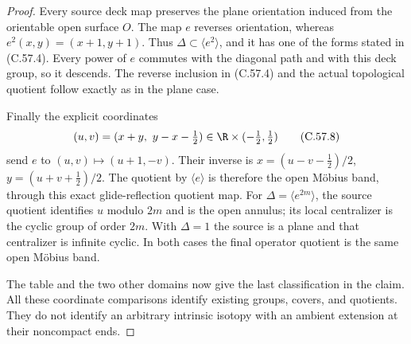\begin{proof}
Every source deck map preserves
the plane orientation induced
from the orientable open surface
$O$. The map $e$ reverses orientation,
whereas $e^2(x,y)=(x+1,y+1)$.
Thus $\Delta\subset\langle e^2\rangle$,
and it has one of the forms stated
in (C.57.4).
Every power of $e$ commutes with
the diagonal path and with this
deck group, so it descends.
The reverse inclusion in (C.57.4)
and the actual topological quotient
follow exactly as in the plane case.

Finally the explicit coordinates
\[
          (u,v)=(x+y,\ y-x-\tfrac12)
        \in\R\times(-\tfrac12,\tfrac12)                 \tag{C.57.8}
\]
send $e$ to $(u,v)\mapsto(u+1,-v)$.
Their inverse is
$x=(u-v-\tfrac12)/2$,
$y=(u+v+\tfrac12)/2$.
The quotient by $\langle e\rangle$
is therefore the open M\"obius
band, through this exact
glide-reflection quotient map.
For $\Delta=\langle e^{2m}\rangle$,
the source quotient identifies
$u$ modulo $2m$ and is the open
annulus; its local centralizer
is the cyclic group of order
$2m$. With $\Delta=1$ the source
is a plane and that centralizer
is infinite cyclic.
In both cases the final operator
quotient is the same open
M\"obius band.

The table and the two other
domains now give the last
classification in the claim.
All these coordinate comparisons
identify existing groups, covers,
and quotients. They do not
identify an arbitrary intrinsic
isotopy with an ambient extension
at their noncompact ends.
\end{proof}
